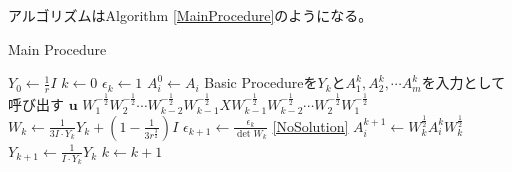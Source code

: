 アルゴリズムはAlgorithm \ref{MainProcedure}のようになる。
\begin{algorithm}
  \caption{Main Procedure}
  \label{MainProcedure}
  \begin{algorithmic}[1]
    \State $\displaystyle{Y_0 \leftarrow \frac{1}{r} I}$
    \State $k \leftarrow 0$
    \State $\epsilon_k \leftarrow 1$
      \State $A_i^0 \leftarrow A_i$
    \EndFor
    \State Basic Procedureを$Y_k$と$A_1^k, A_2^k, \cdots A_m^k$を入力として呼び出す \label{CallBasicProcedure}
      \State \Return $\mathbf{u}$
      \State \Return $\displaystyle{W_1^{-\frac{1}{2}} W_2^{-\frac{1}{2}} \cdots W_{k - 2}^{-\frac{1}{2}} W_{k - 1}^{-\frac{1}{2}} X W_{k - 1}^{-\frac{1}{2}} W_{k - 2}^{-\frac{1}{2}} \cdots W_2^{-\frac{1}{2}} W_1^{-\frac{1}{2}}}$
    \EndIf
    \State $\displaystyle{W_k \leftarrow \frac{1}{3 I \cdot Y_k} Y_k + (1 - \frac{1}{3 r^\frac{3}{2}}) I}$
    \State $\displaystyle{\epsilon_{k + 1} \leftarrow \frac{\epsilon_k}{\det W_k}}$
      \State \Return \ref{NoSolution}
    \EndIf
      \State $\displaystyle{A_i^{k + 1} \leftarrow W_k^\frac{1}{2} A_i^k W_k^\frac{1}{2}}$
    \EndFor
    \State $\displaystyle{Y_{k + 1} \leftarrow \frac{1}{I \cdot Y_k} Y_k}$
    \State $k \leftarrow k + 1$
    \State {}
  \end{algorithmic}
\end{algorithm}
